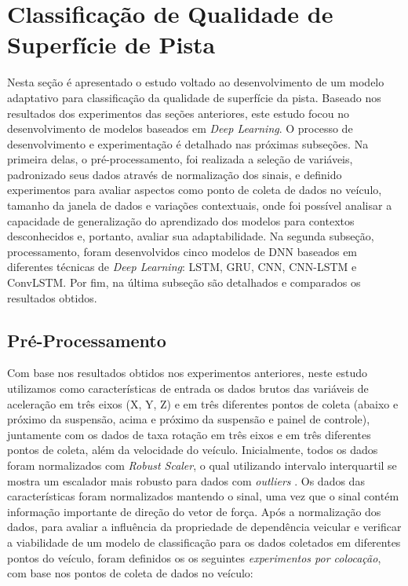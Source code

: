 \chapter{Classificação de Qualidade de Superfície de Pista}
\label{cap:classificacao_qualidade}

Nesta seção é apresentado o estudo voltado ao desenvolvimento de um modelo adaptativo para classificação da qualidade de superfície da pista. Baseado nos resultados dos experimentos das seções anteriores, este estudo focou no desenvolvimento de modelos baseados em \textit{Deep Learning}. O processo de desenvolvimento e experimentação é detalhado nas próximas subseções. Na primeira delas, o pré-processamento, foi realizada a seleção de variáveis, padronizado seus dados através de normalização dos sinais, e definido experimentos para avaliar aspectos como ponto de coleta de dados no veículo, tamanho da janela de dados e variações contextuais, onde foi possível analisar a capacidade de generalização do aprendizado dos modelos para contextos desconhecidos e, portanto, avaliar sua adaptabilidade. Na segunda subseção, processamento, foram desenvolvidos cinco modelos de DNN baseados em diferentes técnicas de \textit{Deep Learning}: LSTM, GRU, CNN, CNN-LSTM e ConvLSTM. Por fim, na última subseção são detalhados e comparados os resultados obtidos.

\section{Pré-Processamento}

Com base nos resultados obtidos nos experimentos anteriores, neste estudo utilizamos como características de entrada os dados brutos das variáveis de aceleração em três eixos (X, Y, Z) e em três diferentes pontos de coleta (abaixo e próximo da suspensão, acima e próximo da suspensão e painel de controle), juntamente com os dados de taxa rotação em três eixos e em três diferentes pontos de coleta, além da velocidade do veículo. Inicialmente, todos os dados foram normalizados com \textit{Robust Scaler}, o qual utilizando intervalo interquartil se mostra um escalador mais robusto para dados com \textit{outliers} \cite{Vaitheeshwari2019}. Os dados das características foram normalizados mantendo o sinal, uma vez que o sinal contém informação importante de direção do vetor de força. Após a normalização dos dados, para avaliar a influência da propriedade de dependência veicular e verificar a viabilidade de um modelo de classificação para os dados coletados em diferentes pontos do veículo, foram definidos os os seguintes \emph{experimentos por colocação}, com base nos pontos de coleta de dados no veículo:

